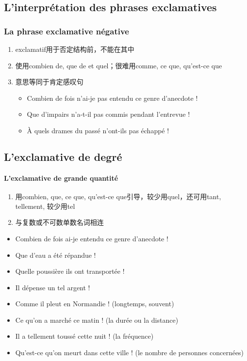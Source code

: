 \documentclass[UTF8]{report}
\begin{document}
\subsection{L’interprétation des phrases exclamatives}
\subsubsection{La phrase exclamative négative}
\begin{enumerate}
    \item exclamatif用于否定结构前，不能在其中
    \item 使用combien de, que de et quel；很难用comme, ce que, qu’est-ce que
    \item 意思等同于肯定感叹句
    \begin{itemize}
        \item Combien de fois n’ai-je pas entendu ce genre d’anecdote !
        \item Que d’impairs n’a-t-il pas commis pendant l’entrevue !
        \item À quels drames du passé n’ont-ils pas échappé !
    \end{itemize}
\end{enumerate}

\subsection{L’exclamative de degré}

\paragraph{L’exclamative de grande quantité}
\begin{enumerate}
    \item 用combien, que, ce que, qu’est-ce que引导，较少用quel，还可用tant, tellement, 较少用tel 
    \item 与复数或不可数单数名词相连
\end{enumerate}
\begin{itemize}
        \item Combien de fois ai-je entendu ce genre d’anecdote !
        \item Que d’eau a été répandue !
        \item Quelle poussière ils ont transportée !
        \item Il dépense un tel argent !
        \item Comme il pleut en Normandie ! (longtemps, souvent)
        \item Ce qu’on a marché ce matin ! (la durée ou la distance)
        \item Il a tellement toussé cette nuit ! (la fréquence)
        \item Qu’est-ce qu’on meurt dans cette ville ! (le nombre de personnes concernées)
    \end{itemize}
\end{document}
